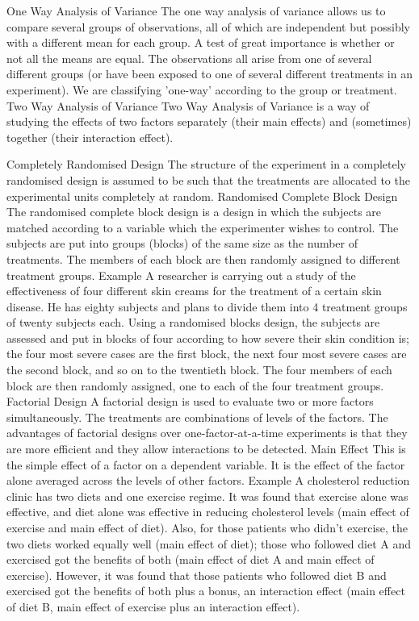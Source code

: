 One Way Analysis of Variance 
The one way analysis of variance allows us to compare several groups of observations, all of which are independent but possibly with a different mean for each group. A test of great importance is whether or not all the means are equal.
The observations all arise from one of several different groups (or have been exposed to one of several different treatments in an experiment). We are classifying 'one-way' according to the group or treatment.
Two Way Analysis of Variance 
Two Way Analysis of Variance is a way of studying the effects of two factors separately (their main effects) and (sometimes) together (their interaction effect).

Completely Randomised Design 
The structure of the experiment in a completely randomised design is assumed to be such that the treatments are allocated to the experimental units completely at random.
Randomised Complete Block Design 
The randomised complete block design is a design in which the subjects are matched according to a variable which the experimenter wishes to control. The subjects are put into groups (blocks) of the same size as the number of treatments. The members of each block are then randomly assigned to different treatment groups.
Example 
A researcher is carrying out a study of the effectiveness of four different skin creams for the treatment of a certain skin disease. He has eighty subjects and plans to divide them into 4 treatment groups of twenty subjects each. Using a randomised blocks design, the subjects are assessed and put in blocks of four according to how severe their skin condition is; the four most severe cases are the first block, the next four most severe cases are the second block, and so on to the twentieth block. The four members of each block are then randomly assigned, one to each of the four treatment groups.
Factorial Design 
A factorial design is used to evaluate two or more factors simultaneously. The treatments are combinations of levels of the factors. The advantages of factorial designs over one-factor-at-a-time experiments is that they are more efficient and they allow interactions to be detected.
Main Effect 
This is the simple effect of a factor on a dependent variable. It is the effect of the factor alone averaged across the levels of other factors.
Example 
A cholesterol reduction clinic has two diets and one exercise regime. It was found that exercise alone was effective, and diet alone was effective in reducing cholesterol levels (main effect of exercise and main effect of diet). Also, for those patients who didn't exercise, the two diets worked equally well (main effect of diet); those who followed diet A and exercised got the benefits of both (main effect of diet A and main effect of exercise). However, it was found that those patients who followed diet B and exercised got the benefits of both plus a bonus, an interaction effect (main effect of diet B, main effect of exercise plus an interaction effect).

